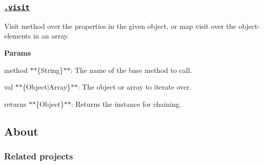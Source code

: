 \subsubsection*{\href{index.js#L235}{\tt .visit}}

Visit {\ttfamily method} over the properties in the given object, or map visit over the object-\/elements in an array.

{\bfseries Params}


\begin{DoxyItemize}
\item {\ttfamily method} $\ast$$\ast$\{String\}$\ast$$\ast$\+: The name of the {\ttfamily base} method to call.
\item {\ttfamily val} $\ast$$\ast$\{Object$\vert$\+Array\}$\ast$$\ast$\+: The object or array to iterate over.
\item {\ttfamily returns} $\ast$$\ast$\{Object\}$\ast$$\ast$\+: Returns the instance for chaining.
\end{DoxyItemize}

\subsection*{About}

\subsubsection*{Related projects}


